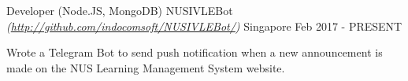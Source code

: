 

\begin{cventries}

		
	
	\cventry
		{Developer (Node.JS, MongoDB)} %
		{NUSIVLEBot \textmd{\em\tiny(\url{http://github.com/indocomsoft/NUSIVLEBot/})}} %
		{Singapore} %
		{Feb 2017 - PRESENT} %
		{
			\begin{cvitems} %
				\item {Wrote a Telegram Bot to send push notification when a new announcement is made on the NUS Learning Management System website.}
			\end{cvitems}
		}
    

\end{cventries}
